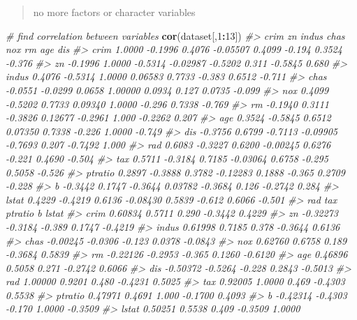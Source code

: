 \documentclass[]{book}
\newenvironment{Shaded}{\begin{snugshade}}{\end{snugshade}}
\newcommand{\CommentTok}[1]{\textcolor[rgb]{0.56,0.35,0.01}{\textit{#1}}}
\newcommand{\DecValTok}[1]{\textcolor[rgb]{0.00,0.00,0.81}{#1}}
\newcommand{\KeywordTok}[1]{\textcolor[rgb]{0.13,0.29,0.53}{\textbf{#1}}}
\newcommand{\NormalTok}[1]{#1}
\newcommand{\OperatorTok}[1]{\textcolor[rgb]{0.81,0.36,0.00}{\textbf{#1}}}
\begin{document}
\begin{quote}
no more factors or character variables
\end{quote}

\begin{Shaded}
\begin{Highlighting}[]
\CommentTok{# find correlation between variables}
\KeywordTok{cor}\NormalTok{(dataset[,}\DecValTok{1}\OperatorTok{:}\DecValTok{13}\NormalTok{])}
\CommentTok{#>            crim      zn   indus     chas     nox     rm     age    dis}
\CommentTok{#> crim     1.0000 -0.1996  0.4076 -0.05507  0.4099 -0.194  0.3524 -0.376}
\CommentTok{#> zn      -0.1996  1.0000 -0.5314 -0.02987 -0.5202  0.311 -0.5845  0.680}
\CommentTok{#> indus    0.4076 -0.5314  1.0000  0.06583  0.7733 -0.383  0.6512 -0.711}
\CommentTok{#> chas    -0.0551 -0.0299  0.0658  1.00000  0.0934  0.127  0.0735 -0.099}
\CommentTok{#> nox      0.4099 -0.5202  0.7733  0.09340  1.0000 -0.296  0.7338 -0.769}
\CommentTok{#> rm      -0.1940  0.3111 -0.3826  0.12677 -0.2961  1.000 -0.2262  0.207}
\CommentTok{#> age      0.3524 -0.5845  0.6512  0.07350  0.7338 -0.226  1.0000 -0.749}
\CommentTok{#> dis     -0.3756  0.6799 -0.7113 -0.09905 -0.7693  0.207 -0.7492  1.000}
\CommentTok{#> rad      0.6083 -0.3227  0.6200 -0.00245  0.6276 -0.221  0.4690 -0.504}
\CommentTok{#> tax      0.5711 -0.3184  0.7185 -0.03064  0.6758 -0.295  0.5058 -0.526}
\CommentTok{#> ptratio  0.2897 -0.3888  0.3782 -0.12283  0.1888 -0.365  0.2709 -0.228}
\CommentTok{#> b       -0.3442  0.1747 -0.3644  0.03782 -0.3684  0.126 -0.2742  0.284}
\CommentTok{#> lstat    0.4229 -0.4219  0.6136 -0.08430  0.5839 -0.612  0.6066 -0.501}
\CommentTok{#>              rad     tax ptratio       b   lstat}
\CommentTok{#> crim     0.60834  0.5711   0.290 -0.3442  0.4229}
\CommentTok{#> zn      -0.32273 -0.3184  -0.389  0.1747 -0.4219}
\CommentTok{#> indus    0.61998  0.7185   0.378 -0.3644  0.6136}
\CommentTok{#> chas    -0.00245 -0.0306  -0.123  0.0378 -0.0843}
\CommentTok{#> nox      0.62760  0.6758   0.189 -0.3684  0.5839}
\CommentTok{#> rm      -0.22126 -0.2953  -0.365  0.1260 -0.6120}
\CommentTok{#> age      0.46896  0.5058   0.271 -0.2742  0.6066}
\CommentTok{#> dis     -0.50372 -0.5264  -0.228  0.2843 -0.5013}
\CommentTok{#> rad      1.00000  0.9201   0.480 -0.4231  0.5025}
\CommentTok{#> tax      0.92005  1.0000   0.469 -0.4303  0.5538}
\CommentTok{#> ptratio  0.47971  0.4691   1.000 -0.1700  0.4093}
\CommentTok{#> b       -0.42314 -0.4303  -0.170  1.0000 -0.3509}
\CommentTok{#> lstat    0.50251  0.5538   0.409 -0.3509  1.0000}
\end{Highlighting}
\end{Shaded}
\end{document}
